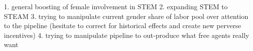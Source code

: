 \documentclass[review]{elsarticle}
\begin{document}
1. general boosting of female involvement in STEM
2. expanding STEM to STEAM
3. trying to manipulate current gender share of labor pool over attention to the pipeline (hesitate to correct for historical effects and create new perverse incentives)
4. trying to manipulate pipeline to out-produce what free agents really want





\end{document}
